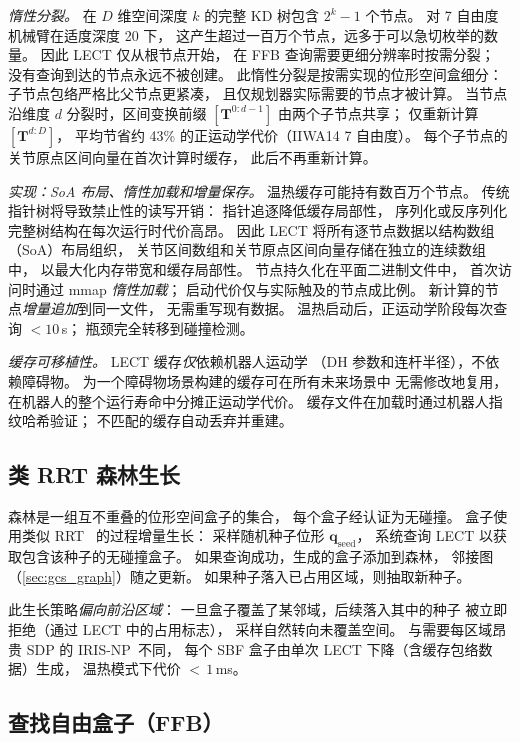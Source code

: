 \documentclass[journal]{IEEEtran}
\newcommand{\bT}{\mathbf{T}}
\begin{document}
\emph{惰性分裂。}
在 $D$ 维空间深度 $k$ 的完整 KD 树包含
$2^k - 1$ 个节点。
对 7 自由度机械臂在适度深度 20 下，
这产生超过一百万个节点，远多于可以急切枚举的数量。
因此 LECT 仅从根节点开始，
在 FFB 查询需要更细分辨率时按需分裂；
没有查询到达的节点永远不被创建。
此惰性分裂是按需实现的位形空间盒细分：
子节点包络严格比父节点更紧凑，
且仅规划器实际需要的节点才被计算。
当节点沿维度 $d$ 分裂时，区间变换前缀
$[\bT^{0:d-1}]$ 由两个子节点共享；
仅重新计算 $[\bT^{d:D}]$，
平均节省约 43\% 的正运动学代价（IIWA14 7 自由度）。
每个子节点的关节原点区间向量在首次计算时缓存，
此后不再重新计算。

\emph{实现：SoA 布局、惰性加载和增量保存。}
温热缓存可能持有数百万个节点。
传统指针树将导致禁止性的读写开销：
指针追逐降低缓存局部性，
序列化或反序列化完整树结构在每次运行时代价高昂。
因此 LECT 将所有逐节点数据以结构数组（SoA）布局组织，
关节区间数组和关节原点区间向量存储在独立的连续数组中，
以最大化内存带宽和缓存局部性。
节点持久化在平面二进制文件中，
首次访问时通过 mmap \emph{惰性加载}；
启动代价仅与实际触及的节点成比例。
新计算的节点\emph{增量追加}到同一文件，
无需重写现有数据。
温热启动后，正运动学阶段每次查询 $<\!10$\,\textmu s；
瓶颈完全转移到碰撞检测。

\emph{缓存可移植性。}
LECT 缓存\emph{仅}依赖机器人运动学
（DH 参数和连杆半径），不依赖障碍物。
为一个障碍物场景构建的缓存可在所有未来场景中
无需修改地复用，
在机器人的整个运行寿命中分摊正运动学代价。
缓存文件在加载时通过机器人指纹哈希验证；
不匹配的缓存自动丢弃并重建。

\subsection{类 RRT 森林生长}\label{sec:forest_growth}

森林是一组互不重叠的位形空间盒子的集合，
每个盒子经认证为无碰撞。
盒子使用类似 RRT~\cite{lavalle1998rapidly} 的过程增量生长：
采样随机种子位形 $\bm{q}_\text{seed}$，
系统查询 LECT 以获取包含该种子的无碰撞盒子。
如果查询成功，生成的盒子添加到森林，
邻接图（\cref{sec:gcs_graph}）随之更新。
如果种子落入已占用区域，则抽取新种子。

此生长策略\emph{偏向前沿区域}：
一旦盒子覆盖了某邻域，后续落入其中的种子
被立即拒绝（通过 LECT 中的占用标志），
采样自然转向未覆盖空间。
与需要每区域昂贵 SDP 的 IRIS-NP~\cite{werner2024fast}不同，
每个 SBF 盒子由单次 LECT 下降（含缓存包络数据）生成，
温热模式下代价 $<$\,$1$\,ms。

\subsection{查找自由盒子（FFB）}\label{sec:ffb}
\end{document}
